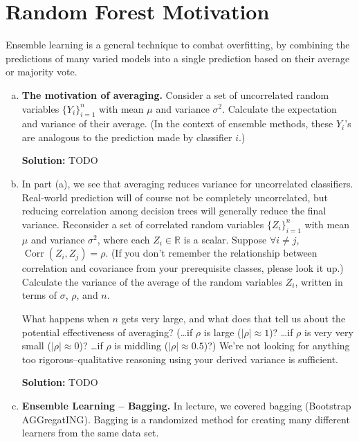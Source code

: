 \documentclass{article}
\newcommand{\Question}[1]{\Large \section{ #1 } \normalsize}
\newenvironment{solution}{\color{blue} \smallskip \textbf{Solution:}}{}
\begin{document}
\newpage
\Question{Random Forest Motivation}
Ensemble learning is a general technique to combat overfitting, by combining the predictions of many varied models into a single prediction based on their average or majority vote.
\begin{enumerate}[(a)]
    \item
    \textbf{The motivation of averaging.} 
    Consider a set of uncorrelated random variables $\{Y_i\}_{i=1}^n$ with mean $\mu$ and variance $\sigma^2$. 
    Calculate the expectation and variance of their average. 
    (In the context of ensemble methods, these $Y_i$'s are analogous to the prediction made by classifier $i$.)

    \begin{solution}
        TODO
    \end{solution}

    \newpage
    \item
    In part (a), we see that averaging reduces variance for uncorrelated classifiers. 
    Real-world prediction will of course not be completely uncorrelated, but reducing correlation among decision trees will generally reduce the final variance. 
    Reconsider a set of correlated random variables $\{Z_i\}_{i=1}^n$ with mean $\mu$ and variance $\sigma^2$, where each $Z_i \in \mathbb{R}$ is a scalar. 
    Suppose $\forall i \neq j$, $\operatorname{Corr}(Z_i, Z_j) = \rho$. 
    (If you don't remember the relationship between correlation and covariance from your prerequisite classes, please look it up.) 
    Calculate the variance of the average of the random variables $Z_i$, written in terms of $\sigma$, $\rho$, and $n$.

    What happens when $n$ gets very large, and what does that tell us about the potential effectiveness of averaging?  (\ldots if $\rho$ is large ($| \rho | \approx 1$)?  \ldots if $\rho$ is very very small ($|\rho| \approx 0$)?  \ldots if $\rho$ is middling ($|\rho| \approx 0.5$)?) 
    We're not looking for anything too rigorous--qualitative reasoning using your derived variance is sufficient.
    
    \begin{solution}
        TODO
    \end{solution}

    \newpage
    \item
    \textbf{Ensemble Learning – Bagging.} 
    In lecture, we covered bagging (Bootstrap AGGregatING). 
    Bagging is a randomized method for creating many different learners from the same data set.
    

\end{enumerate}
\end{document}
